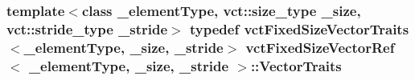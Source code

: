\hypertarget{classvct_fixed_size_vector_ref_a9061c9a151a2e67a207cdff219e165b4}{
\subsubsection[{Vector\-Traits}]{\setlength{\rightskip}{0pt plus 5cm}template$<$class \-\_\-element\-Type, vct\-::size\-\_\-type \-\_\-size, vct\-::stride\-\_\-type \-\_\-stride$>$ typedef {\bf vct\-Fixed\-Size\-Vector\-Traits}$<$\-\_\-element\-Type, \-\_\-size, \-\_\-stride$>$ {\bf vct\-Fixed\-Size\-Vector\-Ref}$<$ \-\_\-element\-Type, \-\_\-size, \-\_\-stride $>$\-::{\bf Vector\-Traits}}}\label{classvct_fixed_size_vector_ref_a9061c9a151a2e67a207cdff219e165b4}


